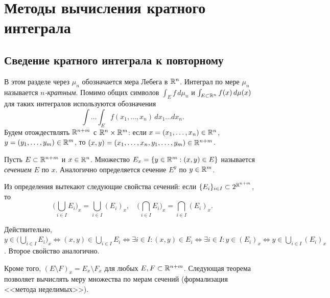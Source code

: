 \section{Методы вычисления кратного интеграла}


\subsection{Сведение кратного интеграла к повторному}

В этом разделе через $\mu_n$ обозначается мера Лебега в $\mathbb{R}^n$.
Интеграл по мере $\mu_n$ называется \textit{$n$-кратным}. 
Помимо общих символов $\int_{E} f \, d\mu_n$ и $\int_{E \subset \mathbb{R}^n} f(x) \, d\mu(x)$ для таких интегралов используются обозначения 
\[ \int \dotsc \int_{E} f(x_1, \dotsc, x_n) \, dx_1 \dotsc dx_n. \]
Будем отождествлять $\mathbb{R}^{n+m}$ с $\mathbb{R}^n \times \mathbb{R}^m$: если $x = (x_1, \dotsc, x_n) \in \mathbb{R}^n$, $y = (y_1, \dotsc, y_m) \in \mathbb{R}^m$, то 
$(x, y) = (x_1, \dotsc, x_n, y_1, \dotsc, y_m) \in \mathbb{R}^{n+m}$.

\begin{definition}
	Пусть $E \subset \mathbb{R}^{n+m}$ и $x \in \mathbb{R}^n$. Множество $E_x = \{y \in \mathbb{R}^m : (x, y) \in E\}$ называется \textit{сечением} $E$ по $x$.
	Аналогично определяется сечение $E^y$ по $y \in \mathbb{R}^m$.
\end{definition}


Из определения вытекают следующие свойства сечений: если $\{E_i\}_{i \in I} \subset 2^{\mathbb{R}^{n+m}}$, то 
\[ \big( \bigcup \limits_{i \in I} E_i \big)_{x} = \bigcup \limits_{i \in I} (E_i)_x, \quad \big( \bigcap \limits_{i \in I} E_i \big)_{x} = \bigcap \limits_{i \in I} (E_i)_x. \]

\begin{myproof}
	Действительно, $y \in \big( \bigcup \limits_{i \in I} E_i \big)_{x} \iff (x, y) \in \bigcup \limits_{i \in I} E_i \iff \exists i \in I : (x, y) \in E_i \iff \exists i \in I : y \in (E_i)_x \iff y \in \bigcup \limits_{i \in I} (E_i)_x$. 
	Второе свойство аналогично.
\end{myproof}

\vspace{5pt}

Кроме того, $(E \setminus F)_x = E_x \setminus F_x$ для любых $E, F \subset \mathbb{R}^{n+m}$.
Следующая теорема позволяет вычислять меру множества по мерам сечений (формализация <<метода неделимых>>).



